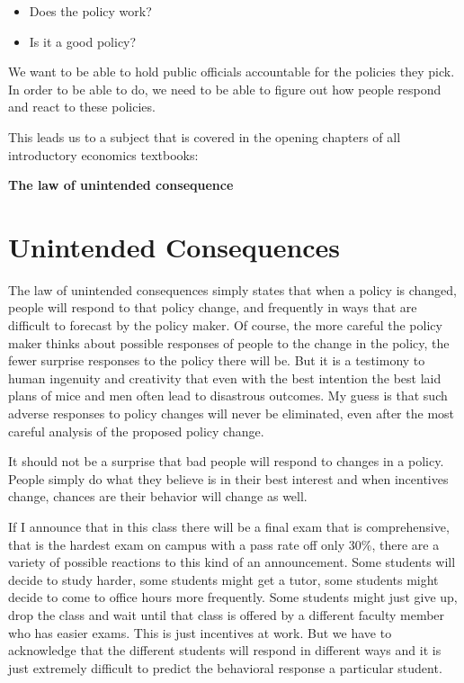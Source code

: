 \documentclass[
]{book}
\providecommand{\tightlist}{%
  \setlength{\itemsep}{0pt}\setlength{\parskip}{0pt}}
\begin{document}
\begin{itemize}
\tightlist
\item
  Does the policy work?
\item
  Is it a good policy?
\end{itemize}

We want to be able to hold public officials accountable for the policies they pick. In order to be able to do, we need to be able to figure out how people respond and react to these policies.

This leads us to a subject that is covered in the opening chapters of all introductory economics textbooks:

\textbf{The law of unintended consequence}

\hypertarget{unintended-consequences}{%
\section{Unintended Consequences}\label{unintended-consequences}}

The law of unintended consequences simply states that when a policy is changed, people will respond to that policy change, and frequently in ways that are difficult to forecast by the policy maker. Of course, the more careful the policy maker thinks about possible responses of people to the change in the policy, the fewer surprise responses to the policy there will be. But it is a testimony to human ingenuity and creativity that even with the best intention the best laid plans of mice and men often lead to disastrous outcomes. My guess is that such adverse responses to policy changes will never be eliminated, even after the most careful analysis of the proposed policy change.

It should not be a surprise that bad people will respond to changes in a policy. People simply do what they believe is in their best interest and when incentives change, chances are their behavior will change as well.

If I announce that in this class there will be a final exam that is comprehensive, that is the hardest exam on campus with a pass rate off only 30\%, there are a variety of possible reactions to this kind of an announcement. Some students will decide to study harder, some students might get a tutor, some students might decide to come to office hours more frequently. Some students might just give up, drop the class and wait until that class is offered by a different faculty member who has easier exams. This is just incentives at work. But we have to acknowledge that the different students will respond in different ways and it is just extremely difficult to predict the behavioral response a particular student.
\end{document}
